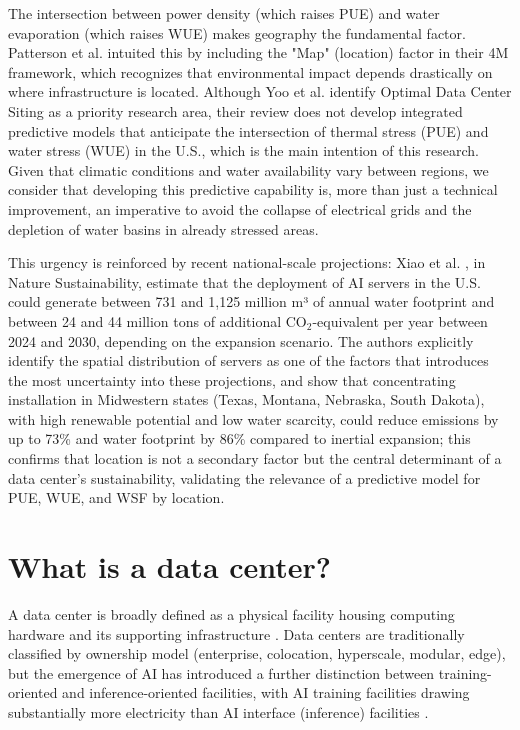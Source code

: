 \documentclass[conference]{IEEEtran}
\begin{document}
The intersection between power density (which raises PUE) and water evaporation (which raises WUE) makes geography the fundamental factor. Patterson et al. \cite{Yoo2026} intuited this by including the "Map" (location) factor in their 4M framework, which recognizes that environmental impact depends drastically on where infrastructure is located. Although Yoo et al. \cite{Yoo2026} identify Optimal Data Center Siting as a priority research area, their review does not develop integrated predictive models that anticipate the intersection of thermal stress (PUE) and water stress (WUE) in the U.S., which is the main intention of this research. Given that climatic conditions and water availability vary between regions, we consider that developing this predictive capability is, more than just a technical improvement, an imperative to avoid the collapse of electrical grids and the depletion of water basins in already stressed areas.

This urgency is reinforced by recent national-scale projections: Xiao et al. \cite{Xiao2025NetZero}, in Nature Sustainability, estimate that the deployment of AI servers in the U.S. could generate between 731 and 1,125 million m³ of annual water footprint and between 24 and 44 million tons of additional CO$_2$-equivalent per year between 2024 and 2030, depending on the expansion scenario. The authors explicitly identify the spatial distribution of servers as one of the factors that introduces the most uncertainty into these projections, and show that concentrating installation in Midwestern states (Texas, Montana, Nebraska, South Dakota), with high renewable potential and low water scarcity, could reduce emissions by up to 73\% and water footprint by 86\% compared to inertial expansion; this confirms that location is not a secondary factor but the central determinant of a data center's sustainability, validating the relevance of a predictive model for PUE, WUE, and WSF by location.

\section{What is a data center?}

A data center is broadly defined as a physical facility housing computing hardware and its supporting infrastructure \cite{AWSDataCenter}. Data centers are traditionally classified by ownership model (enterprise, colocation, hyperscale, modular, edge), but the emergence of AI has introduced a further distinction between training-oriented and inference-oriented facilities, with AI training facilities drawing substantially more electricity than AI interface (inference) facilities \cite{Zakarya2024}.
\end{document}
